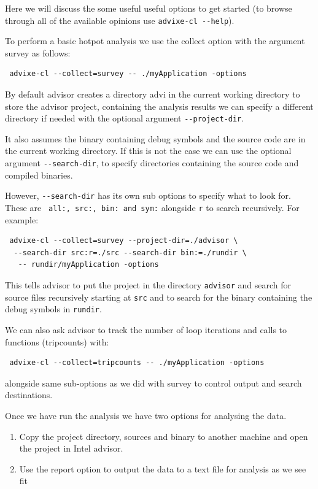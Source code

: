 \documentclass[a4paper, 11pt]{article}
\begin{document}
Here we will discuss the some useful useful options to get started (to browse through all of the available opinions use \verb+advixe-cl --help+). 

To perform a basic hotpot analysis we use the collect option with the argument survey as follows:
\begin{verbatim}
 advixe-cl --collect=survey -- ./myApplication -options
 \end{verbatim}
 
 By default advisor creates a directory advi in the current working directory to store the advisor project, containing the analysis results we can specify a different directory if needed with the optional argument \verb+--project-dir+. 
 
 It also assumes the binary containing debug symbols and the source code are in the current working directory. If this is not the case we can use the optional argument \verb+--search-dir+, to specify directories containing the source code and compiled binaries.
 
However, \verb+--search-dir+ has its own sub options to specify what to look for. These are \verb+ all:, src:, bin: and sym:+ alongside \verb+r+ to search recursively. For example:

\begin{verbatim}
 advixe-cl --collect=survey --project-dir=./advisor \
  --search-dir src:r=./src --search-dir bin:=./rundir \
   -- rundir/myApplication -options
\end{verbatim}
 
This tells advisor to put the project in the directory \verb+advisor+ and search for source files recursively starting at \verb+src+ and to search for the binary containing the debug symbols in \verb+rundir+.

We can also ask advisor to track the number of loop iterations and calls to functions (tripcounts) with:
\begin{verbatim}
 advixe-cl --collect=tripcounts -- ./myApplication -options
 \end{verbatim}

alongside same sub-options as we did with survey to control output and search destinations.

Once we have run the analysis we have two options for analysing the data.

\begin{enumerate}
\item Copy the project directory, sources and binary to another machine and open the project in Intel advisor.
\item Use the report option to output the data to a text file for analysis as we see fit 
\end{enumerate}
 
\end{document}
